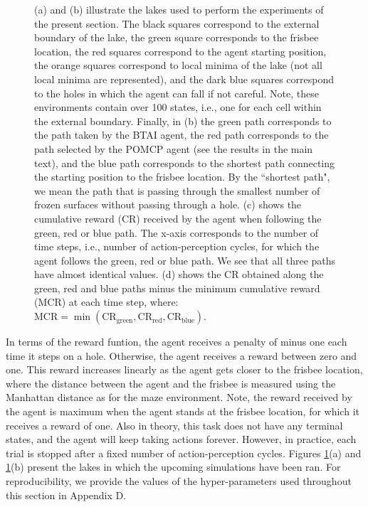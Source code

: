 \documentclass[twoside,11pt]{article}
\begin{document}
{\begin{figure}[H]
\begin{center}
\begin{tikzpicture}[scale=0.32, every node/.style={scale=0.32}]
    \end{tikzpicture}
	\end{center}
\vspace{-0.25cm}
    \caption{
(a) and (b) illustrate the lakes used to perform the experiments of the present section. The black squares correspond to the external boundary of the lake, the green square corresponds to the frisbee location, the red squares correspond to the agent starting position, the orange squares correspond to local minima of the lake (not all local minima are represented), and the dark blue squares correspond to the holes in which the agent can fall if not careful. Note, these environments contain over 100 states, i.e., one for each cell within the external boundary. Finally, in (b) the green path corresponds to the path taken by the BTAI agent, the red path corresponds to the path selected by the POMCP agent (see the results in the main text), and the blue path corresponds to the shortest path connecting the starting position to the frisbee location. By the ``shortest path", we mean the path that is passing through the smallest number of frozen surfaces without passing through a hole. (c) shows the cumulative reward (CR) received by the agent when following the green, red or blue path. The x-axis corresponds to the number of time steps, i.e., number of action-perception cycles, for which the agent follows the green, red or blue path. We see that all three paths have almost identical values. (d) shows the CR obtained along the green, red and blue paths minus the minimum cumulative reward (MCR) at each time step, where: $\text{MCR} = \min (\text{CR}_{\text{green}},\text{CR}_{\text{red}},\text{CR}_{\text{blue}})$.}
    \label{fig:lakes}
\end{figure}
}

In terms of the reward funtion, the agent receives a penalty of minus one each time it steps on a hole. Otherwise, the agent receives a reward between zero and one. This reward increases linearly as the agent gets closer to the frisbee location, where the distance between the agent and the frisbee is measured using the Manhattan distance as for the maze environment. Note, the reward received by the agent is maximum when the agent stands at the frisbee location, for which it receives a reward of one. Also in theory, this task does not have any terminal states, and the agent will keep taking actions forever. However, in practice, each trial is stopped after a fixed number of action-perception cycles. Figures \ref{fig:lakes}(a) and \ref{fig:lakes}(b) present the lakes in which the upcoming simulations have been ran. For reproducibility, we provide the values of the hyper-parameters used throughout this section in Appendix D.
\end{document}
